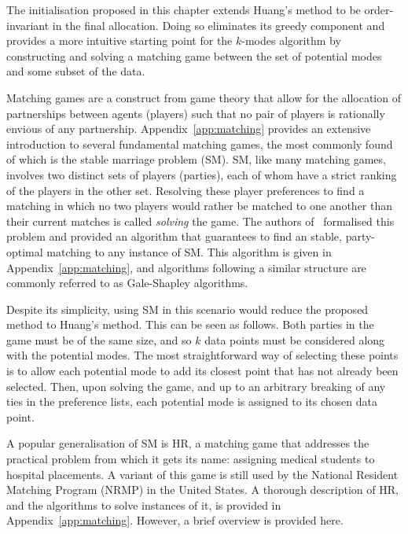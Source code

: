 The initialisation proposed in this chapter extends Huang's method to be
order-invariant in the final allocation. Doing so eliminates its greedy
component and provides a more intuitive starting point for the \(k\)-modes
algorithm by constructing and solving a matching game between the set of
potential modes and some subset of the data.

Matching games are a construct from game theory that allow for the allocation of
partnerships between agents (players) such that no pair of players is rationally
envious of any partnership. Appendix~\ref{app:matching} provides an extensive
introduction to several fundamental matching games, the most commonly found of
which is the stable marriage problem (SM). SM, like many matching games,
involves two distinct sets of players (parties), each of whom have a strict
ranking of the players in the other set. Resolving these player preferences to
find a matching in which no two players would rather be matched to one another
than their current matches is called \emph{solving} the game. The authors
of~\cite{Gale1962} formalised this problem and provided an algorithm that
guarantees to find an stable, party-optimal matching to any instance of SM. This
algorithm is given in Appendix~\ref{app:matching}, and algorithms following a
similar structure are commonly referred to as Gale-Shapley algorithms.

Despite its simplicity, using SM in this scenario would reduce the proposed
method to Huang's method. This can be seen as follows. Both parties in the game
must be of the same size, and so \(k\) data points must be considered along with
the potential modes. The most straightforward way of selecting these points is
to allow each potential mode to add its closest point that has not already been
selected. Then, upon solving the game, and up to an arbitrary breaking of any
ties in the preference lists, each potential mode is assigned to its chosen data
point.

A popular generalisation of SM is HR, a matching game that addresses the
practical problem from which it gets its name: assigning medical students to
hospital placements. A variant of this game is still used by the National
Resident Matching Program (NRMP) in the United States. A thorough description of
HR, and the algorithms to solve instances of it, is provided in
Appendix~\ref{app:matching}. However, a brief overview is provided here.

